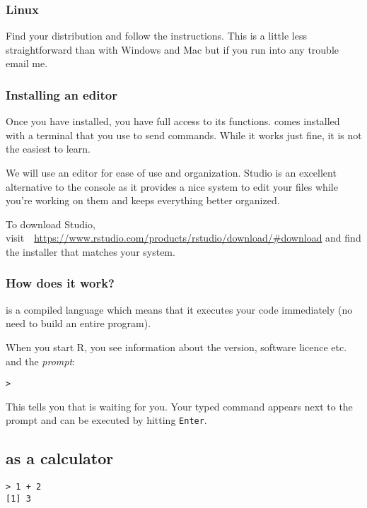 \subsubsection*{Linux}

Find your distribution and follow the instructions. This is a little less straightforward than with Windows and Mac but if you run into any trouble email me.


\subsubsection*{Installing an editor}

Once you have \R installed, you have full access to its functions. \R comes installed with a terminal that you use to send commands. While it works just fine, it is not the easiest to learn.

We will use an editor for ease of use and organization. \R Studio is an excellent alternative to the console as it provides a nice system to edit your files while you're working on them and keeps everything better organized.

To download \R Studio, visit\ \  {\small \url{https://www.rstudio.com/products/rstudio/download/#download}} and find the installer that matches your system.

\subsubsection*{How does it work?}

\R is a compiled language which means that it executes your code immediately (no need to build an entire program).

When you start \textsf{R}, you see information about the version, software licence etc. and the \emph{prompt}:

\begin{lstlisting}
>
\end{lstlisting}

This tells you that \R is waiting for you. Your typed command appears next to the prompt and can be executed by hitting \texttt{Enter}.

\subsection{\R as a calculator}

\begin{lstlisting}
> 1 + 2
[1] 3
\end{lstlisting}

